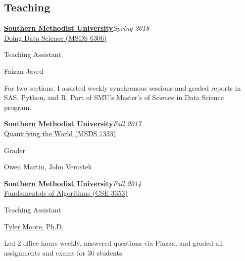 \documentclass[margin, 10pt]{res} %
\newcommand{\Year}[1]{\emph{#1}}
\newcommand{\uni}[1]{\textbf{#1}}
\newcommand{\eventYear}[2]{\uni{#1}\hfill{\Year{#2}}\\}
\newcommand{\SMU}{\href{https://www.smu.edu/}{Southern Methodist University}}
\begin{document}
\begin{resume}
\vspace{10em}

\section{Teaching}

\begin{samepage}
\eventYear{\SMU}{Spring 2018}
\href{https://datascience.smu.edu/academics/curriculum/coursedescriptions/#data-science}{Doing Data Science (MSDS 6306)}
\begin{description}[noitemsep, labelindent=1em]
\item[Role:] Teaching Assistant
\item[Professor:] Faizan Javed
\item For two sections, I assisted weekly synchronous sessions and graded reports in SAS, Python, and R. Part of SMU's Master's of Science in Data Science program.
\end{description}
\end{samepage}

\begin{samepage}
\eventYear{\SMU}{Fall 2017}
\href{https://datascience.smu.edu/academics/curriculum/coursedescriptions/#quantifying}{Quantifying the World (MSDS 7333)}
\begin{description}[noitemsep, labelindent=1em]
\item[Role:] Grader
\item[Professor:] Owen Martin, John Verostek
\end{description}
\end{samepage}

\begin{samepage}
\eventYear{\SMU}{Fall 2014}
\href{https://tylermoore.ens.utulsa.edu/courses/cse3353/}{Fundamentals of Algorithms (CSE 3353)}
\begin{description}[noitemsep, labelindent=1em]
\item[Role:] Teaching Assistant
\item[Professor:] \href{https://tylermoore.ens.utulsa.edu}{Tyler Moore, Ph.D.}
\item Led 2 office hours weekly, answered questions via Piazza, and graded all assignments and exams for 30 students.
\end{description}
\end{samepage}




\end{resume}
\end{document}
